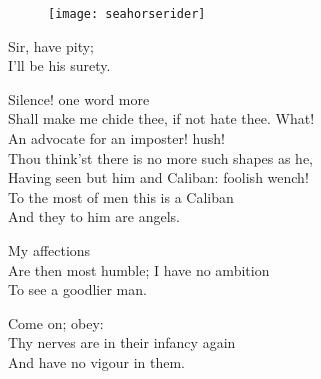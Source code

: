 
\begin{a4}
	\begin{figure}[tb]
		\centering
		\texttt{[image: seahorserider]}
	\end{figure}
\end{a4}
	
	
\begin{verse_speech}[Miranda] 
Sir, have pity;\\
I'll be his surety.
\end{verse_speech}

\begin{verse_speech}[Prospero] 
Silence! one word more\\
Shall make me chide thee, if not hate thee. What!\\
An advocate for an imposter! hush!\\
Thou think'st there is no more such shapes as he,\\
Having seen but him and Caliban: foolish wench!\\
To the most of men this is a Caliban\\
And they to him are angels.
\end{verse_speech}

\begin{verse_speech}[Miranda] 
My affections\\
Are then most humble; I have no ambition\\
To see a goodlier man.
\end{verse_speech}

\begin{verse_speech}[Prospero] 
Come on; obey:\\
Thy nerves are in their infancy again\\
And have no vigour in them.
\end{verse_speech}

